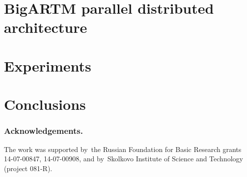 \documentclass{llncs}
\begin{document}
\cite{hoffman10online}

\cite{zhang13sparse}

\section{BigARTM parallel distributed architecture}
\label{sec:BigARTM}

\section{Experiments}
\label{sec:Experiments}

\section{Conclusions}
\label{sec:Conclusions}

\bigskip
\subsubsection*{Acknowledgements.}
    The work was supported by~the Russian Foundation for Basic Research grants 14-07-00847, 14-07-00908,
    and by~Skolkovo Institute of Science and Technology (project 081-R).

%


\end{document}
